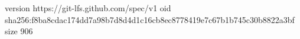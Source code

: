 version https://git-lfs.github.com/spec/v1
oid sha256:f8ba8cdac174dd7a98b7d8d4d1c16cb8ec8778419e7c67b1b745c30b8822a3bf
size 906
